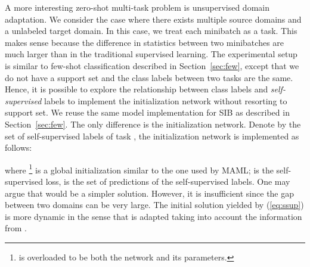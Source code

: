 \documentclass{article} \usepackage{iclr2020_conference,times}
\def\eqref#1{(\ref{#1})}
\begin{document}
\begin{table}[t]
\centering
\footnotesize
{}
\caption{Multi-source domain adaptation results on PACS with ResNet-18 features.
Three domains are used as the source domains keeping the fourth one as target.}
\label{tab:uda}
\end{table}


A more interesting zero-shot multi-task problem is unsupervised domain adaptation.
We consider the case where there exists multiple source domains and a unlabeled target domain.
In this case, we treat each minibatch as a task. This makes sense because the difference in statistics between two minibatches 
are much larger than in the traditional supervised learning.
The experimental setup is similar to few-shot classification described in Section~\ref{sec:few},
except that we do not have a support set and the class labels between two tasks are the same.
Hence, it is possible to explore the relationship between class labels and \emph{self-supervised} labels to implement 
the initialization network  without resorting to support set.
We reuse the same model implementation for SIB as described in Section~\ref{sec:few}. The only difference is the initialization network.
Denote by  the set of self-supervised labels of task , 
the initialization network  is implemented as follows:

where \footnote{ is overloaded to be both the network and its parameters.} 
is a global initialization similar to the one used by MAML; 
 is the self-supervised loss,  is the set of predictions of the self-supervised labels. 
One may argue that  would be a simpler solution. 
However, it is insufficient since the gap between two domains can be very large.
The initial solution yielded by \eqref{eq:ssup} is more dynamic in the sense that 
 is adapted taking into account the information from .
\end{document}
